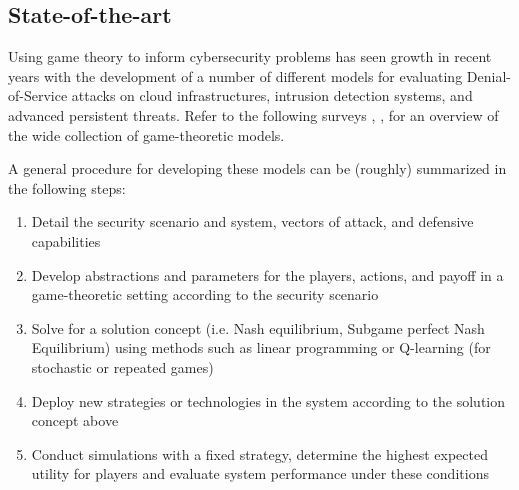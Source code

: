 



 



\subsection{State-of-the-art}
\label{}
Using game theory to inform cybersecurity problems has seen growth in recent years with the development of a number of different models for evaluating Denial-of-Service attacks on cloud infrastructures, intrusion detection systems, and advanced persistent threats. Refer to the following surveys \cite{Pawlick2019}, \cite{Hausken2024}, \cite{Manshaei2013} for an overview of the wide collection of game-theoretic models. 

A general procedure for developing these models can be (roughly) summarized in the following steps: 
\begin{enumerate}
	\item Detail the security scenario and system, vectors of attack, and defensive capabilities
	\item Develop abstractions  and parameters for the players, actions, and payoff in a game-theoretic setting according to the security scenario
	\item Solve for a solution concept (i.e. Nash equilibrium, Subgame perfect Nash Equilibrium) using methods such as linear programming or Q-learning (for stochastic or repeated games)
	\item Deploy new strategies or technologies in the system according to the solution concept above
	\item Conduct simulations with a fixed strategy, determine the highest expected utility for players and evaluate system performance under these conditions
\end{enumerate}

